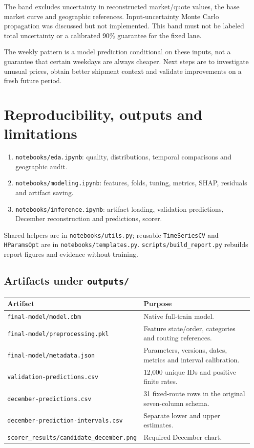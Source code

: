 \documentclass[10pt,a4paper]{article}
\newcommand{\code}[1]{\nolinkurl{#1}}
\begin{document}
The band excludes uncertainty in reconstructed market/quote values, the base market curve and geographic references. Input-uncertainty Monte Carlo propagation was discussed but not implemented. This band must not be labeled total uncertainty or a calibrated 90\% guarantee for the fixed lane.

The weekly pattern is a model prediction conditional on these inputs, not a guarantee that certain weekdays are always cheaper. Next steps are to investigate unusual prices, obtain better shipment context and validate improvements on a fresh future period.

\newpage
\section{Reproducibility, outputs and limitations}
\begin{enumerate}
\item \code{notebooks/eda.ipynb}: quality, distributions, temporal comparisons and geographic audit.
\item \code{notebooks/modeling.ipynb}: features, folds, tuning, metrics, SHAP, residuals and artifact saving.
\item \code{notebooks/inference.ipynb}: artifact loading, validation predictions, December reconstruction and predictions, scorer.
\end{enumerate}
Shared helpers are in \code{notebooks/utils.py}; reusable \code{TimeSeriesCV} and \code{HParamsOpt} are in \code{notebooks/templates.py}. \code{scripts/build_report.py} rebuilds report figures and evidence without training.
\subsection*{Artifacts under \code{outputs/}}
\par\noindent\begin{tabularx}{\linewidth}{lY}
\toprule Artifact & Purpose \\
\midrule \code{final-model/model.cbm} & Native full-train model. \\
\code{final-model/preprocessing.pkl} & Feature state/order, categories and routing references. \\
\code{final-model/metadata.json} & Parameters, versions, dates, metrics and interval calibration. \\
\code{validation-predictions.csv} & 12,000 unique IDs and positive finite rates. \\
\code{december-predictions.csv} & 31 fixed-route rows in the original seven-column schema. \\
\code{december-prediction-intervals.csv} & Separate lower and upper estimates. \\
\code{scorer_results/candidate_december.png} & Required December chart. \\
\bottomrule
\end{tabularx}\par
\end{document}
